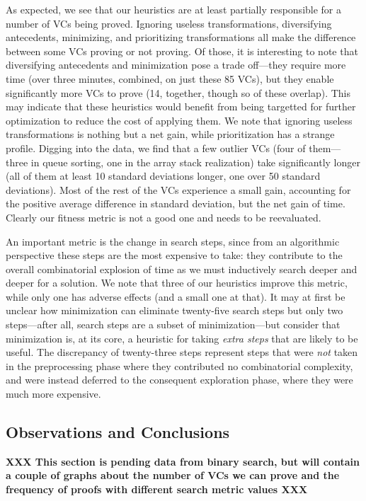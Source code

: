 As expected, we see that our heuristics are at least partially responsible for a number of VCs being proved.  Ignoring useless transformations, diversifying antecedents, minimizing, and prioritizing transformations all make the difference between some VCs proving or not proving.  Of those, it is interesting to note that diversifying antecedents and minimization pose a trade off---they require more time (over three minutes, combined, on just these 85 VCs), but they enable significantly more VCs to prove (14, together, though so of these overlap).  This may indicate that these heuristics would benefit from being targetted for further optimization to reduce the cost of applying them.  We note that ignoring useless transformations is nothing but a net gain, while prioritization has a strange profile.  Digging into the data, we find that a few outlier VCs (four of them---three in queue sorting, one in the array stack realization) take significantly longer (all of them at least 10 standard deviations longer, one over 50 standard deviations).  Most of the rest of the VCs experience a small gain, accounting for the positive average difference in standard deviation, but the net gain of time.  Clearly our fitness metric is not a good one and needs to be reevaluated.

An important metric is the change in search steps, since from an algorithmic perspective these steps are the most expensive to take: they contribute to the overall combinatorial explosion of time as we must inductively search deeper and deeper for a solution.  We note that three of our heuristics improve this metric, while only one has adverse effects (and a small one at that).  It may at first be unclear how minimization can eliminate twenty-five search steps but only two steps---after all, search steps are a subset of minimization---but consider that minimization is, at its core, a heuristic for taking \emph{extra steps} that are likely to be useful.  The discrepancy of twenty-three steps represent steps that were \emph{not} taken in the preprocessing phase where they contributed no combinatorial complexity, and were instead deferred to the consequent exploration phase, where they were much more expensive.


\subsection{Observations and Conclusions\label{proverEvalConclusion}}
\textbf{XXX This section is pending data from binary search, but will contain a couple of graphs about the number of VCs we can prove and the frequency of proofs with different search metric values XXX}
